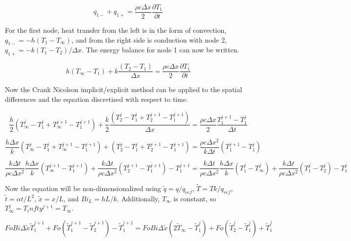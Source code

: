 \documentclass[conf]{new-aiaa}
\begin{document}
\begin{equation}
\label{sample:equation}
   q_{1-}+q_{1+}=\frac{\rho c \Delta x}{2}\frac{\partial T_1}{\partial t}
\end{equation}

For the first node, heat transfer from the left is in the form of convection, $q_{1-}=-h(T_1-T_\infty)$, and from the right side is conduction with node 2, $q_{1+}=-k(T_1-T_2)/\Delta x$. The energy balance for node 1 can now be written.

\begin{equation}
\label{sample:equation}
h(T_\infty-T_1) + k\frac{(T_2-T_1)}{\Delta x}=\frac{\rho c \Delta x}{2}\frac{\partial T_1}{\partial t}
\end{equation}

Now the Crank Nicolson implicit/explicit method can be applied to the spatial differences and the equation discretized with respect to time.

\begin{equation}
\label{sample:equation}
\frac{h}{2}(T^j_\infty-T^j_1+T^{j+1}_\infty-T^{j+1}_1) + \frac{k}{2}\frac{(T^{j}_2-T^{j}_1+T^{j+1}_2-T^{j+1}_1)}{\Delta x}=\frac{\rho c \Delta x}{2}\frac{T_1^{j+1}-T^{j}_1}{\Delta t}
\end{equation}

\begin{equation}
\label{sample:equation}
\frac{h \Delta x}{k}(T^j_\infty-T^j_1+T^{j+1}_\infty-T^{j+1}_1) +(T^{j}_2-T^{j}_1+T^{j+1}_2-T^{j+1}_1)=\frac{\rho c \Delta x^2}{k \Delta t}(T_1^{j+1}-T^{j}_1)
\end{equation}

\begin{equation}
\label{sample:equation}
\frac{k \Delta t}{\rho c \Delta x^2}\frac{h \Delta x}{k}(T^{j+1}_\infty-T^{j+1}_1)
+\frac{k \Delta t}{\rho c \Delta x^2}(T_2^{j+1}-T_1^{j+1})-T_1^{j+1}
=
\frac{k \Delta t}{\rho c \Delta x^2}\frac{h \Delta x}{k}(T^{j}_1-T^{j}_\infty)
+\frac{k \Delta t}{\rho c \Delta x^2}(T_1^{j}-T_2^{j})-T_1^{j}
\end{equation}

Now the equation will be non-dimensionalized using $\tilde{q}=q/q_{ref}$, $\tilde{T}=T k/q_{ref}$, $\tilde{t}=\alpha t/L^2$, $\tilde{x}=x/L$, and $Bi_L=hL/k$. Additionally, $T_\infty$ is constant, so $T_\infty^j=T_infty^{j+1}=T_\infty$.

\begin{equation}
\label{sample:equation}
Fo Bi \Delta \tilde{x} \tilde{T}^{j+1}_1
+Fo (\tilde{T}_1^{j+1}-\tilde{T}_2^{j+1})-\tilde{T}_1^{j+1}
=
Fo Bi \Delta \tilde{x} (2\tilde{T}_\infty-\tilde{T}^{j}_1)
+Fo (\tilde{T}_2^{j}-\tilde{T}_1^{j})+\tilde{T}_1^{j}
\end{equation}
\end{document}
